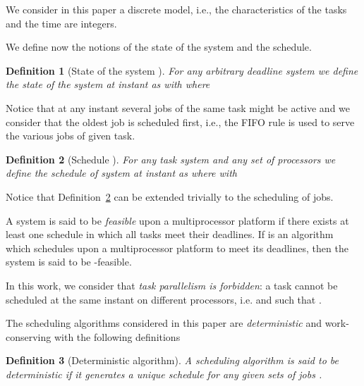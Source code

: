 \documentclass[a4paper,11pt]{article}
\newcommand{\drop}[1]{}
\newtheorem{Definition}{Definition}
\begin{document}
We consider in this paper a discrete model, i.e., the characteristics
of the tasks and the time are integers. 



We define now the notions of the state of the system and the schedule.

\begin{Definition} [State of the system ] \label{defState}
  For any arbitrary deadline system  we define the {\em state}  of the system  at instant  as  with  where
  

\end{Definition}
Notice that at any instant  several jobs of the same task might be
active and we consider that the oldest job is scheduled first,
i.e., the FIFO rule is used to serve the various jobs of
given task. 

\drop{
If we consider the case of constrained deadline task systems, then Definition~ref{defState} is modified as follows:
\begin{Definition} [State of the system ] \label{defStatebis}
  For any constrained deadline system  we define the {\em state}  of the system  at instant  as  with  where
  

\end{Definition}
}

\begin{Definition} [Schedule ] \label{defSched}
  For any task system  and any
   set of  processors  we define the
  {\em schedule}  of system  at instant  as
    where  with \\
  
\end{Definition}

Notice that Definition~\ref{defSched} can be extended trivially to the
scheduling of jobs.

A system  is said to be {\it feasible} upon a multiprocessor
platform if there exists at least one schedule in which all tasks meet
their deadlines. If  is an algorithm which schedules  upon a
multiprocessor platform to meet its deadlines, then the system 
is said to be -feasible.

In this work, we consider that \emph{task parallelism is forbidden}: a task
cannot be scheduled at the same instant on different processors,
i.e.  and  such that .

The scheduling algorithms considered in this paper are {\em
  deterministic} and work-conserving with the following definitions

\begin{Definition}[Deterministic algorithm]\label{detAlg} 
A scheduling algorithm is said to
be \emph{deterministic} if it generates a unique schedule for any
given sets of jobs .
\end{Definition}
\end{document}
